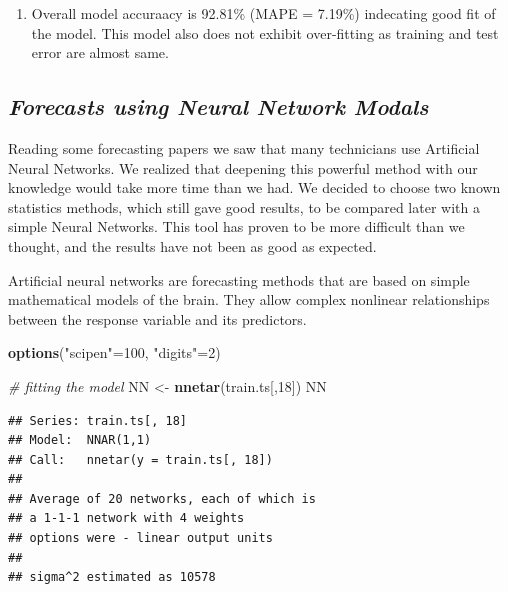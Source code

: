 \documentclass[12pt,openany]{book}
\newenvironment{Shaded}{\begin{snugshade}}{\end{snugshade}}
\newcommand{\CommentTok}[1]{\textcolor[rgb]{0.56,0.35,0.01}{\textit{#1}}}
\newcommand{\DecValTok}[1]{\textcolor[rgb]{0.00,0.00,0.81}{#1}}
\newcommand{\KeywordTok}[1]{\textcolor[rgb]{0.13,0.29,0.53}{\textbf{#1}}}
\newcommand{\NormalTok}[1]{#1}
\newcommand{\StringTok}[1]{\textcolor[rgb]{0.31,0.60,0.02}{#1}}
\providecommand{\tightlist}{%
  \setlength{\itemsep}{0pt}\setlength{\parskip}{0pt}}
\begin{document}
\begin{enumerate}
\def\labelenumi{\arabic{enumi}.}
\tightlist
\item
  Overall model accuraacy is 92.81\% (MAPE = 7.19\%) indecating good fit of the model. This model also does not exhibit over-fitting as training and test error are almost same.
\end{enumerate}

\hypertarget{forecasts-using-neural-network-modals}{%
\subsection{\texorpdfstring{\textbf{\emph{Forecasts using Neural Network Modals}}}{Forecasts using Neural Network Modals}}\label{forecasts-using-neural-network-modals}}

Reading some forecasting papers we saw that many technicians use Artificial Neural Networks. We realized that deepening this powerful method with our knowledge would take more time than we had. We decided to choose two known statistics methods, which still gave good results, to be compared later with a simple Neural Networks. This tool has proven to be more difficult than we thought, and the results have not been as good as expected.

Artificial neural networks are forecasting methods that are based on simple mathematical models of the brain. They allow complex nonlinear relationships between the response variable and its predictors.

\begin{Shaded}
\begin{Highlighting}[]
\KeywordTok{options}\NormalTok{(}\StringTok{"scipen"}\NormalTok{=}\DecValTok{100}\NormalTok{, }\StringTok{"digits"}\NormalTok{=}\DecValTok{2}\NormalTok{)}

\CommentTok{# fitting the model}
\NormalTok{NN <-}\StringTok{ }\KeywordTok{nnetar}\NormalTok{(train.ts[,}\DecValTok{18}\NormalTok{])}
\NormalTok{NN}
\end{Highlighting}
\end{Shaded}

\begin{verbatim}
## Series: train.ts[, 18] 
## Model:  NNAR(1,1) 
## Call:   nnetar(y = train.ts[, 18])
## 
## Average of 20 networks, each of which is
## a 1-1-1 network with 4 weights
## options were - linear output units 
## 
## sigma^2 estimated as 10578
\end{verbatim}
\end{document}
